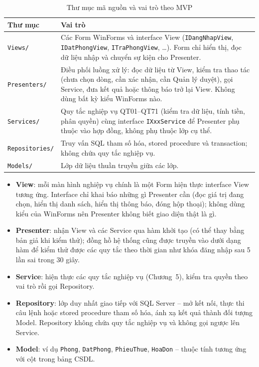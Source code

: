 \documentclass[14pt]{report}
\begin{document}
\begin{table}[H]
\centering
\caption{Thư mục mã nguồn và vai trò theo MVP}
\label{tab:mvp-thumuc}
\begin{tabularx}{\textwidth}{|l|X|}
\hline
\textbf{Thư mục} & \textbf{Vai trò} \\\hline
\texttt{Views/} & Các Form WinForms và interface View (\texttt{IDangNhapView}, \texttt{IDatPhongView}, \texttt{ITraPhongView}, \dots). Form chỉ hiển thị, đọc dữ liệu nhập và chuyển sự kiện cho Presenter. \\\hline
\texttt{Presenters/} & Điều phối luồng xử lý: đọc dữ liệu từ View, kiểm tra thao tác (chưa chọn dòng, cần xác nhận, cần Quản lý duyệt), gọi Service, đưa kết quả hoặc thông báo trở lại View. Không dùng bất kỳ kiểu WinForms nào. \\\hline
\texttt{Services/} & Quy tắc nghiệp vụ QT01--QT71 (kiểm tra dữ liệu, tính tiền, phân quyền) cùng interface \texttt{IXxxService} để Presenter phụ thuộc vào hợp đồng, không phụ thuộc lớp cụ thể. \\\hline
\texttt{Repositories/} & Truy vấn SQL tham số hóa, stored procedure và transaction; không chứa quy tắc nghiệp vụ. \\\hline
\texttt{Models/} & Lớp dữ liệu thuần truyền giữa các lớp. \\\hline
\end{tabularx}
\end{table}

\begin{itemize}
  \item \textbf{View}: mỗi màn hình nghiệp vụ chính là một Form hiện thực interface View tương ứng. Interface chỉ khai báo những gì Presenter cần (đọc giá trị đang chọn, hiển thị danh sách, hiển thị thông báo, đóng hộp thoại); không dùng kiểu của WinForms nên Presenter không biết giao diện thật là gì.
  \item \textbf{Presenter}: nhận View và các Service qua hàm khởi tạo (có thể thay bằng bản giả khi kiểm thử); đồng hồ hệ thống cũng được truyền vào dưới dạng hàm để kiểm thử được các quy tắc theo thời gian như khóa đăng nhập sau 5 lần sai trong 30 giây.
  \item \textbf{Service}: hiện thực các quy tắc nghiệp vụ (Chương~5), kiểm tra quyền theo vai trò rồi gọi Repository.
  \item \textbf{Repository}: lớp duy nhất giao tiếp với SQL Server -- mở kết nối, thực thi câu lệnh hoặc stored procedure tham số hóa, ánh xạ kết quả thành đối tượng Model. Repository không chứa quy tắc nghiệp vụ và không gọi ngược lên Service.
  \item \textbf{Model}: ví dụ \texttt{Phong}, \texttt{DatPhong}, \texttt{PhieuThue}, \texttt{HoaDon} -- thuộc tính tương ứng với cột trong bảng CSDL.
\end{itemize}
\end{document}
